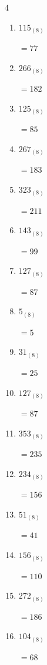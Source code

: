 \begin{multicols}{4}
\begin{enumerate}
        $=135$

  \item $115_{(8)}$

        $=77$

  \item $266_{(8)}$

        $=182$

  \item $125_{(8)}$

        $=85$

  \item $267_{(8)}$

        $=183$

  \item $323_{(8)}$

        $=211$

  \item $143_{(8)}$

        $=99$

  \item $127_{(8)}$

        $=87$

  \item $5_{(8)}$

        $=5$

  \item $31_{(8)}$

        $=25$

  \item $127_{(8)}$

        $=87$

  \item $353_{(8)}$

        $=235$

  \item $234_{(8)}$

        $=156$

\columnbreak %

  \item $51_{(8)}$

        $=41$

  \item $156_{(8)}$

        $=110$

  \item $272_{(8)}$

        $=186$

  \item $104_{(8)}$

        $=68$


\end{enumerate}
\end{multicols}

